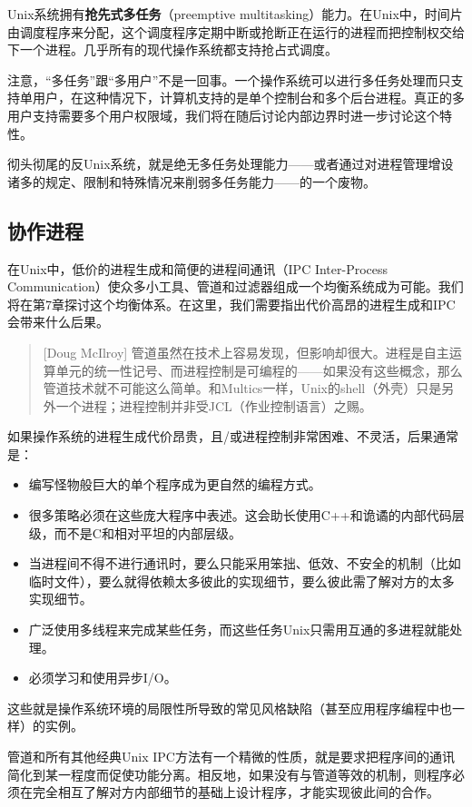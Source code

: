 \documentclass[12pt,oneside]{ctexbook}
\begin{document}
\begin{common-format}
Unix系统拥有\textbf{抢先式多任务}（preemptive multitasking）能力。在Unix中，时间片由调度程序来分配，这个调度程序定期中断或抢断正在运行的进程而把控制权交给下一个进程。几乎所有的现代操作系统都支持抢占式调度。

注意，“多任务”跟“多用户”不是一回事。一个操作系统可以进行多任务处理而只支持单用户，在这种情况下，计算机支持的是单个控制台和多个后台进程。真正的多用户支持需要多个用户权限域，我们将在随后讨论内部边界时进一步讨论这个特性。

彻头彻尾的反Unix系统，就是绝无多任务处理能力——或者通过对进程管理增设诸多的规定、限制和特殊情况来削弱多任务能力——的一个废物。

\subsection{协作进程}
在Unix中，低价的进程生成和简便的进程间通讯（IPC Inter-Process Communication）使众多小工具、管道和过滤器组成一个均衡系统成为可能。我们将在第7章探讨这个均衡体系。在这里，我们需要指出代价高昂的进程生成和IPC会带来什么后果。

\begin{quote}[Doug McIlroy]
管道虽然在技术上容易发现，但影响却很大。进程是自主运算单元的统一性记号、而进程控制是可编程的——如果没有这些概念，那么管道技术就不可能这么简单。和Multics一样，Unix的shell（外壳）只是另外一个进程；进程控制并非受JCL（作业控制语言）之赐。
\end{quote}

如果操作系统的进程生成代价昂贵，且/或进程控制非常困难、不灵活，后果通常是：
\begin{itemize}
\item 编写怪物般巨大的单个程序成为更自然的编程方式。
\item 很多策略必须在这些庞大程序中表述。这会助长使用C++和诡谲的内部代码层级，而不是C和相对平坦的内部层级。
\item 当进程间不得不进行通讯时，要么只能采用笨拙、低效、不安全的机制（比如临时文件），要么就得依赖太多彼此的实现细节，要么彼此需了解对方的太多实现细节。
\item 广泛使用多线程来完成某些任务，而这些任务Unix只需用互通的多进程就能处理。
\item 必须学习和使用异步I/O。
\end{itemize}

这些就是操作系统环境的局限性所导致的常见风格缺陷（甚至应用程序编程中也一样）的实例。

管道和所有其他经典Unix IPC方法有一个精微的性质，就是要求把程序间的通讯简化到某一程度而促使功能分离。相反地，如果没有与管道等效的机制，则程序必须在完全相互了解对方内部细节的基础上设计程序，才能实现彼此间的合作。


\end{common-format}
\end{document}
